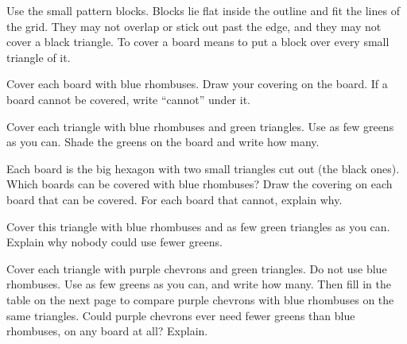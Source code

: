 \documentclass[12pt]{article}
\newcommand{\body}{\fontsize{13.5}{17.5}\selectfont}
\begin{document}
\body

Use the small pattern blocks. Blocks lie flat inside the outline and fit the lines of the grid. They may not overlap or stick out past the edge, and they may not cover a black triangle. To cover a board means to put a block over every small triangle of it.

\vspace{0.25in}
 Cover each board with blue rhombuses. Draw your covering on the board. If a board cannot be covered, write ``cannot'' under it.

\vspace{0.15in}

\newpage
{}

\newpage
{} Cover each triangle with blue rhombuses and green triangles. Use as few greens as you can. Shade the greens on the board and write how many.

\vspace{0.15in}

\newpage
{}

\newpage
{} Each board is the big hexagon with two small triangles cut out (the black ones). Which boards can be covered with blue rhombuses? Draw the covering on each board that can be covered. For each board that cannot, explain why.

\vspace{0.15in}

\newpage
{}

\newpage
{} Cover this triangle with blue rhombuses and as few green triangles as you can. Explain why nobody could use fewer greens.

\vspace{0.1in}

\newpage
\noindent\begin{minipage}[t]{6.3in}\vspace{0pt}\raggedright
{} Cover each triangle with purple chevrons and green triangles. Do not use blue rhombuses. Use as few greens as you can, and write how many. Then fill in the table on the next page to compare purple chevrons with blue rhombuses on the same triangles. Could purple chevrons ever need fewer greens than blue rhombuses, on any board at all? Explain.
\end{minipage}\hfill
\begin{minipage}[t]{0.9in}\vspace{6pt}\raggedleft\end{minipage}\par
\end{document}
